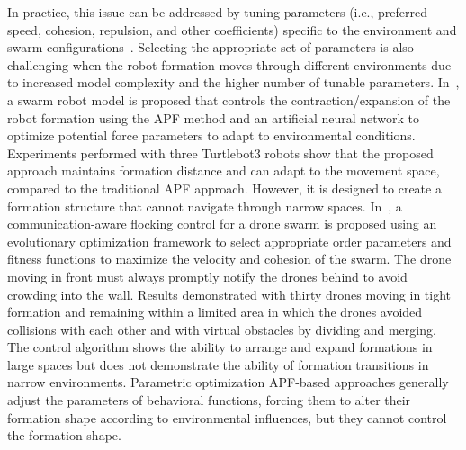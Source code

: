 In practice, this issue can be addressed by tuning parameters (i.e., preferred speed, cohesion, repulsion, and other coefficients) specific to the environment and swarm configurations~\cite{Elkilany2020,Vsrhelyi2018}. Selecting the appropriate set of parameters is also challenging when the robot formation moves through different environments due to increased model complexity and the higher number of tunable parameters. In~\cite{Elkilany2020}, a swarm robot model is proposed that controls the contraction/expansion of the robot formation using the APF method and an artificial neural network to optimize potential force parameters to adapt to environmental conditions. Experiments performed with three Turtlebot3 robots show that the proposed approach maintains formation distance and can adapt to the movement space, compared to the traditional APF approach. However, it is designed to create a formation structure that cannot navigate through narrow spaces. In~\cite{Vsrhelyi2018}, a communication-aware flocking control for a drone swarm is proposed using an evolutionary optimization framework to select appropriate order parameters and fitness functions to maximize the velocity and cohesion of the swarm. The drone moving in front must always promptly notify the drones behind to avoid crowding into the wall. Results demonstrated with thirty drones moving in tight formation and remaining within a limited area in which the drones avoided collisions with each other and with virtual obstacles by dividing and merging. The control algorithm shows the ability to arrange and expand formations in large spaces but does not demonstrate the ability of formation transitions in narrow environments. Parametric optimization APF-based approaches generally adjust the parameters of behavioral functions, forcing them to alter their formation shape according to environmental influences, but they cannot control the formation shape.

